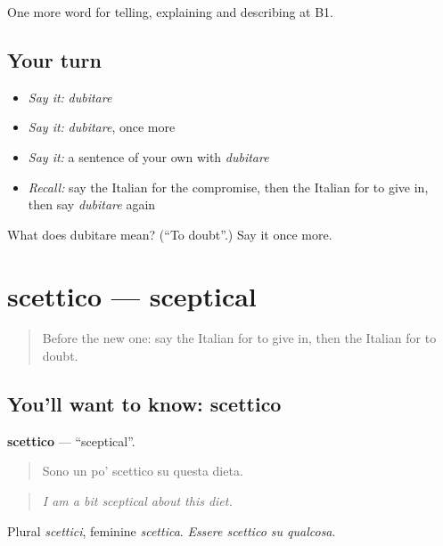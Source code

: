 \begin{grammarlens}[title={What you've built}]
One more word for telling, explaining and describing at B1.
\end{grammarlens}

\subsection*{Your turn}
\begin{itemize}
\raggedright
  \item \emph{Say it:} \emph{dubitare}
  \item \emph{Say it:} \emph{dubitare}, once more
  \item \emph{Say it:} a sentence of your own with \emph{dubitare}
  \item \emph{Recall:} say the Italian for the compromise, then the Italian for to give in, then say \emph{dubitare} again
\end{itemize}

\begin{tcolorbox}[breakable,colback=teal!4,colframe=teal!35!black,title={Before you move on}]
What does dubitare mean? (\textquotedblleft{}To doubt\textquotedblright{}.) Say it once more.
\end{tcolorbox}
\section[scettico]{scettico — sceptical}

\label{lesson:IT-C343-scettico}



\begin{quote}
Before the new one: say the Italian for to give in, then the Italian for to doubt.
\end{quote}

\subsection*{You'll want to know: scettico}
\textbf{scettico} — \textquotedblleft{}sceptical\textquotedblright{}.

\begin{quote}
Sono un po' scettico su questa dieta.
\end{quote}

\begin{quote}
\emph{I am a bit sceptical about this diet.}
\end{quote}

Plural \emph{scettici}, feminine \emph{scettica}. \emph{Essere scettico su qualcosa}.

